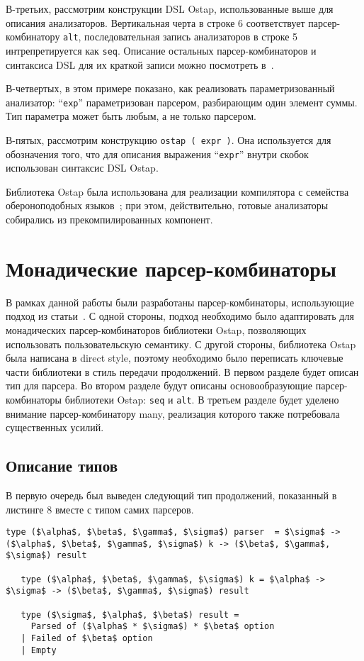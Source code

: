 В-третьих, рассмотрим конструкции DSL Ostap, использованные выше для описания анализаторов. Вертикальная черта в строке 6 соответствует парсер-комбинатору \lstinline|alt|, последовательная запись анализаторов в строке 5 интрепретируется как \lstinline|seq|. Описание остальных парсер-комбинаторов и синтаксиса DSL для их краткой записи можно посмотреть в~\cite{ostap}.

В-четвертых, в этом примере показано, как реализовать параметризованный анализатор: ``\lstinline|exp|'' параметризован парсером, разбирающим один элемент суммы. Тип параметра может быть любым, а не только парсером.

В-пятых, рассмотрим конструкцию \lstinline|ostap ( expr )|. Она используется для обозначения того, что для описания выражения ``\lstinline|expr|'' внутри скобок использован синтаксис DSL Ostap.

Библиотека Ostap была использована для реализации компилятора с семейства обероноподобных языков~\cite{boulytchev2015combinators}; при этом, действительно, готовые анализаторы собирались из прекомпилированных компонент.

\section{Монадические парсер-комбинаторы}

В рамках данной работы были разработаны парсер-комбинаторы, использующие подход из статьи~\cite{meerkat}. С одной стороны, подход необходимо было адаптировать для монадических парсер-комбинаторов библиотеки Ostap, позволяющих использовать пользовательскую семантику. С другой стороны, библиотека Ostap была написана в direct style, поэтому необходимо было переписать ключевые части библиотеки в стиль передачи продолжений.  В первом разделе будет описан тип для парсера. Во втором разделе будут описаны основообразующие парсер-комбинаторы библиотеки Ostap: \lstinline|seq| и \lstinline|alt|. В третьем разделе будет уделено внимание парсер-комбинатору many, реализация которого также потребовала существенных усилий.

\subsection{Описание типов}

В первую очередь был выведен следующий тип продолжений, показанный в листинге 8 вместе с типом самих парсеров.

\begin{lstlisting}[basicstyle=\small, caption=Тип парсера и продолжения]
   type ($\alpha$, $\beta$, $\gamma$, $\sigma$) parser  = $\sigma$ -> ($\alpha$, $\beta$, $\gamma$, $\sigma$) k -> ($\beta$, $\gamma$, $\sigma$) result

   type ($\alpha$, $\beta$, $\gamma$, $\sigma$) k = $\alpha$ -> $\sigma$ -> ($\beta$, $\gamma$, $\sigma$) result

   type ($\sigma$, $\alpha$, $\beta$) result =
     Parsed of ($\alpha$ * $\sigma$) * $\beta$ option
   | Failed of $\beta$ option
   | Empty
\end{lstlisting}

